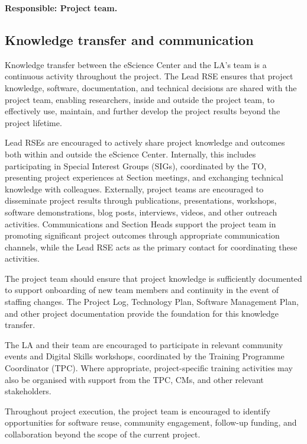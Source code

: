 \textbf{Responsible: Project team.} 

\subsection{Knowledge transfer and communication}
\label{sec:exec:knowledge}

Knowledge transfer between the eScience Center and the LA's team is a continuous activity throughout the project.
The Lead RSE ensures that project knowledge, software, documentation, and technical decisions are shared with the
project team, enabling researchers, inside and outside the project team, to effectively use, maintain, and further 
develop the project results beyond the project lifetime.

Lead RSEs are encouraged to actively share project knowledge and outcomes both within and outside the eScience Center.
Internally, this includes participating in Special Interest Groups (SIGs), coordinated by the TO, presenting project
experiences at Section meetings, and exchanging technical knowledge with colleagues. Externally, project teams are
encouraged to disseminate project results through publications, presentations, workshops, software demonstrations,
blog posts, interviews, videos, and other outreach activities. Communications and Section Heads support the project 
team in promoting significant project outcomes through appropriate communication channels, while the Lead RSE acts as 
the primary contact for coordinating these activities.

The project team should ensure that project knowledge is sufficiently documented to support onboarding of new team
members and continuity in the event of staffing changes. The Project Log, Technology Plan, Software Management Plan,
and other project documentation provide the foundation for this knowledge transfer.

The LA and their team are encouraged to participate in relevant community events and Digital Skills workshops,
coordinated by the Training Programme Coordinator (TPC). Where appropriate, project-specific training activities may
also be organised with support from the TPC, CMs, and other relevant stakeholders.

Throughout project execution, the project team is encouraged to identify opportunities for software reuse, community
engagement, follow-up funding, and collaboration beyond the scope of the current project.

